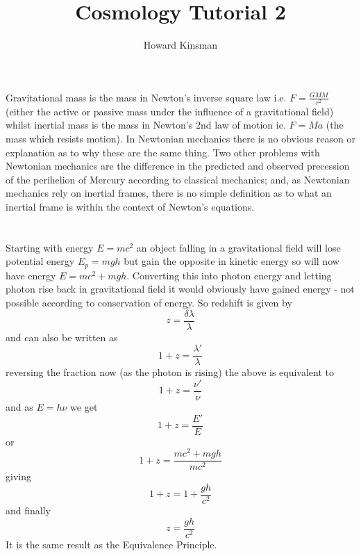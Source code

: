 \documentclass[a4paper,12pt]{article}
\author{Howard Kinsman}
\title{Cosmology Tutorial 2}
\begin{document}
\maketitle

\section{}
Gravitational mass is the mass in Newton's inverse square law i.e. $F=\frac{GMM}{r^2}$ (either the active or passive mass
under the influence of a gravitational field) whilst inertial mass is the mass in
Newton's 2nd law of motion ie. $F=Ma$ (the mass which resists motion). In Newtonian mechanics there is no obvious reason
or explanation as to why these are the same thing.
Two other problems with Newtonian mechanics are the difference in the predicted and observed precession of the 
perihelion of Mercury according to classical mechanics; and, as Newtonian mechanics rely on inertial frames, there is no
simple definition as to what an inertial frame is within the context of Newton's equations.

\section{}
Starting with energy $E=mc^2$ an object falling in a gravitational field will lose potential energy $E_p=mgh$ but gain
the opposite in kinetic energy so will now have energy $E=mc^2+mgh$. Converting this into photon energy and letting photon
rise back in gravitational field it would obviously have gained energy - not possible according to conservation of energy.
So redshift is given by
\begin{equation}
z=\frac{\delta\lambda}{\lambda}
\end{equation}
and can also be written as 
\begin{equation}
1+z=\frac{\lambda'}{\lambda}
\end{equation}
reversing the fraction now (as the photon is rising) the above is equivalent to
\begin{equation}
1+z=\frac{\nu'}{\nu}
\end{equation}
and as $E=h\nu$ we get
\begin{equation}
1+z=\frac{E'}{E}
\end{equation}
or
\begin{equation}
1+z=\frac{mc^2+mgh}{mc^2}
\end{equation} 
giving 
\begin{equation}
1+z=1+\frac{gh}{c^2}
\end{equation}
and finally 
\begin{equation}
z=\frac{gh}{c^2}
\end{equation}
It is the same result as the Equivalence Principle.
\end{document}
